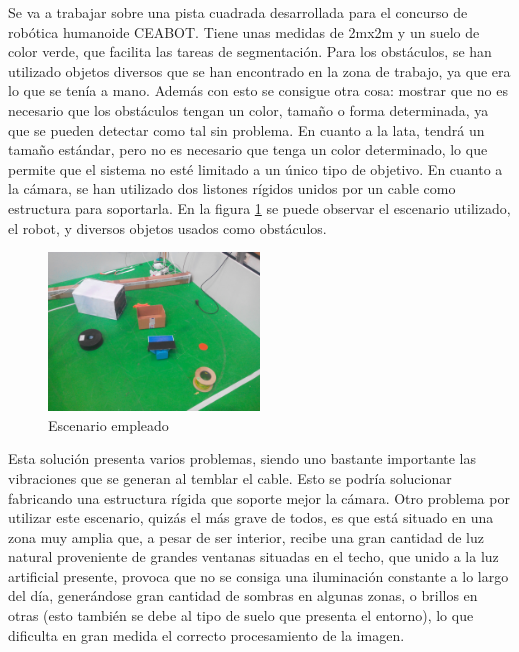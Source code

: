 Se va a trabajar sobre una pista cuadrada desarrollada para el concurso de robótica humanoide CEABOT. Tiene unas medidas de 2mx2m y un suelo de color verde, que facilita las tareas de segmentación. Para los obstáculos, se han utilizado objetos diversos que se han encontrado en la zona de trabajo, ya que era lo que se tenía a mano. Además con esto se consigue otra cosa: mostrar que no es necesario que los obstáculos tengan un color, tamaño o forma determinada, ya que se pueden detectar como tal sin problema. En cuanto a la lata, tendrá un tamaño estándar, pero no es necesario que tenga un color determinado, lo que permite que el sistema no esté limitado a un único tipo de objetivo. En cuanto a la cámara, se han utilizado dos listones rígidos unidos por un cable como estructura para soportarla. En la figura \ref{fig:escenario} se puede observar el escenario utilizado, el robot, y diversos objetos usados como obstáculos.\\

\begin{figure}[H]
        \centering
        \includegraphics[width=0.5\textwidth]{images/environment_without_david.jpg}
        \caption{Escenario empleado}
        \label{fig:escenario}
\end{figure} 

Esta solución presenta varios problemas, siendo uno bastante importante las vibraciones que se generan al temblar el cable. Esto se podría solucionar fabricando una estructura rígida que soporte mejor la cámara. Otro problema por utilizar este escenario, quizás el más grave de todos, es que está situado en una zona muy amplia que, a pesar de ser interior, recibe una gran cantidad de luz natural proveniente de grandes ventanas situadas en el techo, que unido a la luz artificial presente, provoca que no se consiga una iluminación constante a lo largo del día, generándose gran cantidad de sombras en algunas zonas, o brillos en otras (esto también se debe al tipo de suelo que presenta el entorno), lo que dificulta en gran medida el correcto procesamiento de la imagen.\\  
